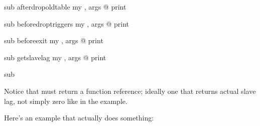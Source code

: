 \documentclass[letterpaper,10pt,english]{sphinxmanual}
\begin{document}
\begin{sphinxVerbatim}[commandchars=\\\{\}]
 sub after\PYGZus{}drop\PYGZus{}old\PYGZus{}table 
    my , \PYGZpc{}args  @\PYGZus{}
    print 

 sub before\PYGZus{}drop\PYGZus{}triggers 
    my , \PYGZpc{}args  @\PYGZus{}
    print 

 sub before\PYGZus{}exit 
    my , \PYGZpc{}args  @\PYGZus{}
    print 

 sub get\PYGZus{}slave\PYGZus{}lag 
    my , \PYGZpc{}args  @\PYGZus{}
    print 

     sub    

\end{sphinxVerbatim}

\sphinxAtStartPar
Notice that  must return a function reference;
ideally one that returns actual slave lag, not simply zero like in the example.

\sphinxAtStartPar
Here’s an example that actually does something:
\end{document}
